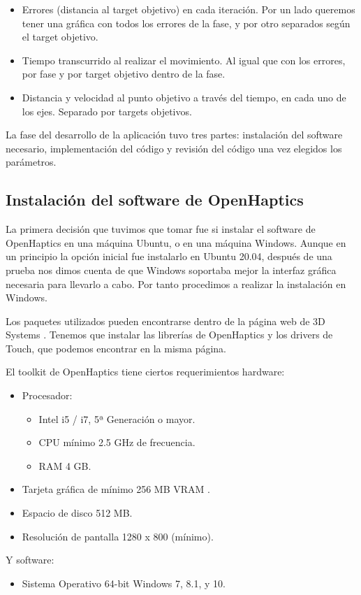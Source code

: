 \documentclass[a4paper,11pt, oneside]{book}
\begin{document}
\begin{itemize}
	\begin{itemize}
		\item Errores (distancia al target objetivo) en cada iteración. Por un lado queremos tener una gráfica con todos los errores de la fase, y por otro separados según el target objetivo.
		\item Tiempo transcurrido al realizar el movimiento. Al igual que con los errores, por fase y por target objetivo dentro de la fase.
		\item Distancia y velocidad al punto objetivo a través del tiempo, en cada uno de los ejes. Separado por targets objetivos.
	\end{itemize}
\end{itemize}


La fase del desarrollo de la aplicación tuvo tres partes: instalación del software necesario, implementación del código y revisión del código una vez elegidos los parámetros.

\subsection{Instalación del software de OpenHaptics}

La primera decisión que tuvimos que tomar fue si instalar el software de OpenHaptics en una máquina Ubuntu, o en una máquina Windows. Aunque en un principio la opción inicial fue instalarlo en Ubuntu 20.04, después de una prueba nos dimos cuenta de que Windows soportaba mejor la interfaz gráfica necesaria para llevarlo a cabo. Por tanto procedimos a realizar la instalación en Windows.

Los paquetes utilizados pueden encontrarse dentro de la página web de 3D Systems \cite{download}. Tenemos que instalar las librerías de OpenHaptics y los drivers de Touch, que podemos encontrar en la misma página. 

El toolkit de OpenHaptics tiene ciertos requerimientos hardware:
\begin{itemize}
	\item Procesador: 
	\begin{itemize}
		\item Intel i5 / i7, 5ª Generación o mayor.
		\item CPU mínimo 2.5 GHz de frecuencia.
		\item RAM 4 GB.
	\end{itemize}
	\item Tarjeta gráfica de mínimo 256 MB VRAM .
	\item Espacio de disco 512 MB.
	\item Resolución de pantalla 1280 x 800 (mínimo).
\end{itemize}
Y software:
\begin{itemize}
	\item Sistema Operativo 64-bit Windows 7, 8.1, y 10.
\end{itemize}
\end{document}
